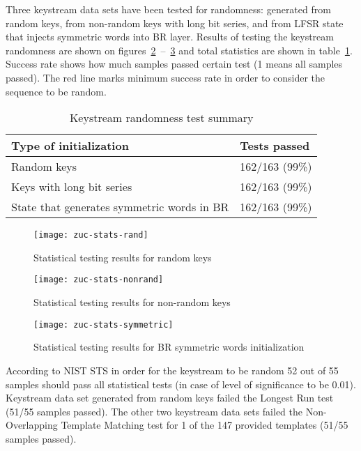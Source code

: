 Three keystream data sets have been tested for randomness: generated from
random keys, from non-random keys with long bit series, and from LFSR state that injects
symmetric words into BR layer. Results of testing the keystream randomness are
shown on figures~\ref{fig:zuc-stats-rand}~--~\ref{fig:zuc-stats-symmetric} and total
statistics are shown in table~\ref{tbl:zuc-stats}. Success rate shows how much
samples passed certain test (1 means all samples passed). The red line marks
minimum success rate in order to consider the sequence to be random.

\begin{table}[htbp]
    \centering
    \caption{Keystream randomness test summary}
    \label{tbl:zuc-stats}
    \begin{tabular}{|l|l|} \hline
        Type of initialization & Tests passed \\ \hline
        Random keys & 162/163 (99\%) \\ \hline
        Keys with long bit series & 162/163 (99\%) \\ \hline
        State that generates symmetric words in BR & 162/163 (99\%) \\ \hline
    \end{tabular}
\end{table}

\begin{figure}[htbp]
	\centering
	\texttt{[image: zuc-stats-rand]}
	\caption{Statistical testing results for random keys}
	\label{fig:zuc-stats-rand}
\end{figure}


\begin{figure}[htbp]
	\centering
	\texttt{[image: zuc-stats-nonrand]}
	\caption{Statistical testing results for non-random keys}
	\label{fig:zuc-stats-rand}
\end{figure}

\begin{figure}[htbp]
	\centering
	\texttt{[image: zuc-stats-symmetric]}
	\caption{Statistical testing results for BR symmetric words initialization}
	\label{fig:zuc-stats-symmetric}
\end{figure}
 
According to NIST STS in order for the keystream to be random 52 out of 55
samples should pass all statistical tests (in case of level of significance to
be 0.01). Keystream data set generated from random keys failed the Longest Run
test (51/55 samples passed). The other two keystream data sets failed the
Non-Overlapping Template Matching test for 1 of the 147 provided templates
(51/55 samples passed).

